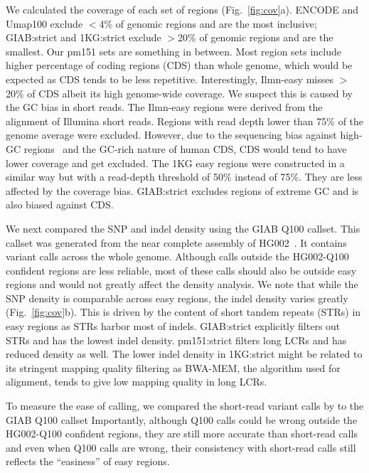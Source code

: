 \documentclass[webpdf,contemporary,large,namedate]{oup-authoring-template}%
\begin{document}
We calculated the coverage of each set of regions (Fig.~\ref{fig:cov}a).
ENCODE and Umap100 exclude $<$4\% of genomic regions and are the most inclusive;
GIAB:strict and 1KG:strict exclude $>$20\% of genomic regions and are the smallest.
Our pm151 sets are something in between.
Most region sets include higher percentage of coding regions (CDS) than whole genome, which would be expected as CDS tends to be less repetitive.
Interestingly, Ilmn-easy misses $>$20\% of CDS albeit its high genome-wide coverage.
We suspect this is caused by the GC bias in short reads.
The Ilmn-easy regions were derived from the alignment of Illumina short reads.
Regions with read depth lower than 75\% of the genome average were excluded.
However, due to the sequencing bias against high-GC regions~\citep{Benjamini:2012aa} and the GC-rich nature of human CDS,
CDS would tend to have lower coverage and get excluded.
The 1KG easy regions were constructed in a similar way but with a read-depth threshold of 50\% instead of 75\%.
They are less affected by the coverage bias.
GIAB:strict excludes regions of extreme GC and is also biased against CDS.

We next compared the SNP and indel density using the GIAB Q100 callset.
This callset was generated from the near complete assembly of HG002~\citep{Rautiainen:2023ab}.
It contains variant calls across the whole genome.
Although calls outside the HG002-Q100 confident regions are less reliable,
most of these calls should also be outside easy regions and would not greatly affect the density analysis.
We note that while the SNP density is comparable across easy regions,
the indel density varies greatly (Fig.~\ref{fig:cov}b).
This is driven by the content of short tandem repeats (STRs) in easy regions as STRs harbor most of indels.
GIAB:strict explicitly filters out STRs and has the lowest indel density.
pm151:strict filters long LCRs and has reduced density as well.
The lower indel density in 1KG:strict might be related to its stringent mapping quality filtering
as BWA-MEM, the algorithm used for alignment, tends to give low mapping quality in long LCRs.

To measure the ease of calling, we compared the short-read variant calls by \citet{Baid2020.12.11.422022} to the GIAB Q100 callset
Importantly, although Q100 calls could be wrong outside the HG002-Q100 confident regions,
they are still more accurate than short-read calls
and even when Q100 calls are wrong, their consistency with short-read calls
still reflects the ``easiness'' of easy regions.
\end{document}
